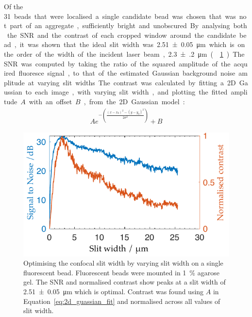 Of the \SI{31} beads that were localised a single candidate bead was chosen that
was not part of an aggregate,
sufficiently bright and unobscured.
By analysing both the \gls{SNR} and the contrast of each cropped window around the candidate bead, it was shown that the ideal slit width was \SI{2.51(5)}{\micro\metre} which is on the order of the width of the incident laser beam, \SI{2.3(2)}{\micro\metre} (\figurename~\ref{fig:optimal_slit_snr_contrast}).
The \gls{SNR} was computed by taking the ratio of the squared amplitude of the acquired fluoresce signal, to that of the estimated Gaussian background noise amplitude at varying slit widths.
The contrast was calculated by fitting a \gls{2D} Gaussian to each image, with varying slit width, and plotting the fitted amplitude \(A\) with an offset \(B\), from the \gls{2D} Gaussian model:
\begin{align}
  A e^{-\left(\frac{(x-x_0)^2-(y-y_0)^2}{2\sigma^2}\right)}+B \label{eq:2d_guassian_fit}
\end{align}
\begin{figure}
  \centering
  \includegraphics{Chapters/dualslit/Figs/PDF/optimal_slit_snr_contrast}
  \caption[Optimising the confocal slit width by varying slit width on a single fluorescent bead.]{
  Optimising the confocal slit width by varying slit width on a single fluorescent bead.
  Fluorescent beads were mounted in \SI{1}{\percent} agarose gel.
  The \gls{SNR} and normalised contrast show peaks at a slit width of \SI{2.51(5)}{\micro\metre} which is optimal.
  Contrast was found using \( A\) in Equation~\eqref{eq:2d_guassian_fit} and normalised across all values of slit width.
  }
  \label{fig:optimal_slit_snr_contrast}
\end{figure}
